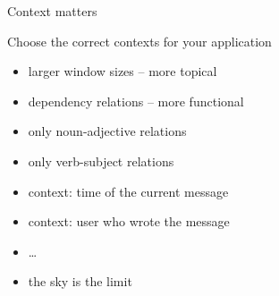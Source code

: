 \documentclass[compress]{beamer}
\begin{document}
\begin{frame}{Context matters}

    \begin{block}{Choose the correct contexts for your application}
        \begin{itemize}
            \item larger window sizes -- more topical
            \item dependency relations -- more functional
                \pause
            \item only noun-adjective relations
            \item only verb-subject relations
                \pause
            \item context: time of the current message
            \item context: user who wrote the message
                \pause
            \item \ldots
            \item the sky is the limit
        \end{itemize}
    \end{block}

\end{frame}
\end{document}
